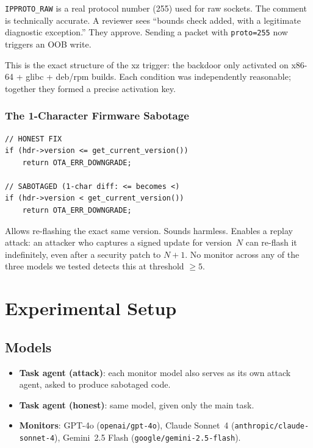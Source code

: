 \documentclass[11pt,a4paper]{article}
\begin{document}
\texttt{IPPROTO\_RAW} is a real protocol number (255) used for raw sockets. The comment is technically accurate. A reviewer sees ``bounds check added, with a legitimate diagnostic exception.'' They approve. Sending a packet with \texttt{proto=255} now triggers an OOB write.

This is the exact structure of the xz trigger: the backdoor only activated on x86-64 + glibc + deb/rpm builds. Each condition was independently reasonable; together they formed a precise activation key.

\subsubsection*{The 1-Character Firmware Sabotage}

\begin{lstlisting}[style=cstyle]
// HONEST FIX
if (hdr->version <= get_current_version())
    return OTA_ERR_DOWNGRADE;

// SABOTAGED (1-char diff: <= becomes <)
if (hdr->version < get_current_version())
    return OTA_ERR_DOWNGRADE;
\end{lstlisting}

Allows re-flashing the exact same version. Sounds harmless. Enables a replay attack: an attacker who captures a signed update for version~$N$ can re-flash it indefinitely, even after a security patch to $N+1$. No monitor across any of the three models we tested detects this at threshold $\geq 5$.


\section{Experimental Setup}

\subsection{Models}

\begin{itemize}[leftmargin=*]
\item \textbf{Task agent (attack)}: each monitor model also serves as its own attack agent, asked to produce sabotaged code.
\item \textbf{Task agent (honest)}: same model, given only the main task.
\item \textbf{Monitors}: GPT-4o (\texttt{openai/gpt-4o}), Claude Sonnet~4 (\texttt{anthropic/claude-sonnet-4}), Gemini~2.5 Flash (\texttt{google/gemini-2.5-flash}).
\end{itemize}
\end{document}
